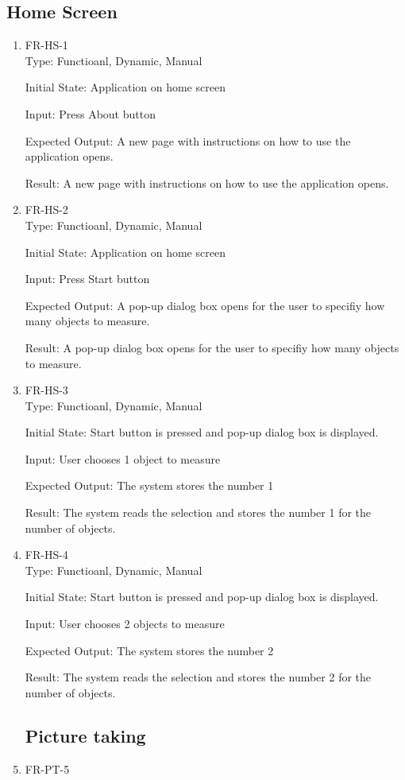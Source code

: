 \documentclass[12pt, titlepage]{article}
\begin{document}
\subsection{Home Screen}
\begin{enumerate}
\item{FR-HS-1\\}
Type: Functioanl, Dynamic, Manual

Initial State: Application on home screen

Input: Press About button

Expected Output: A new page with instructions on how to use the application opens.

Result: A new page with instructions on how to use the application opens.

\item{FR-HS-2\\}
Type: Functioanl, Dynamic, Manual

Initial State: Application on home screen

Input: Press Start button

Expected Output: A pop-up dialog box opens for the user to specifiy how many objects to measure.

Result: A pop-up dialog box opens for the user to specifiy how many objects to measure.


\item{FR-HS-3\\}
Type: Functioanl, Dynamic, Manual

Initial State: Start button is pressed and pop-up dialog box is displayed.

Input: User chooses 1 object to measure

Expected Output: The system stores the number 1

Result: The system reads the selection and stores the number 1 for the number of objects.


\item{FR-HS-4\\}
Type: Functioanl, Dynamic, Manual

Initial State: Start button is pressed and pop-up dialog box is displayed.

Input: User chooses 2 objects to measure

Expected Output: The system stores the number 2

Result: The system reads the selection and stores the number 2 for the number of objects.

\subsection{Picture taking}
\item{FR-PT-5\\}


\end{enumerate}
\end{document}
